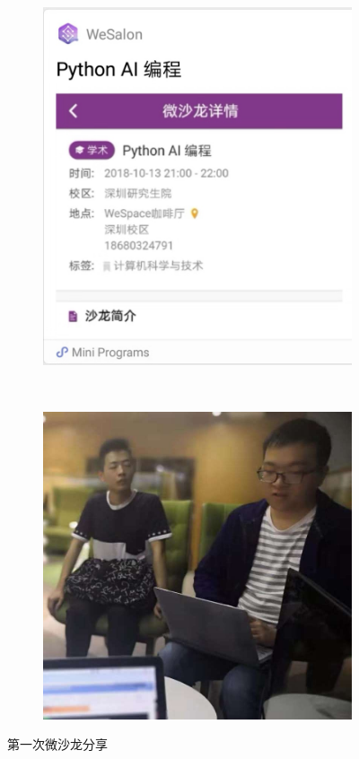 \documentclass[12pt]{ctexart}
\begin{document}
\begin{figure}[!ht]
\centering
  \begin{subfigure}[b]{0.4\textwidth}
  \includegraphics[width=\textwidth]{1/1.jpeg}  
    \end{subfigure}~
      \begin{subfigure}[b]{0.5\textwidth}
  \includegraphics[width=\textwidth]{1/wesalon.jpeg}  
    \end{subfigure}
    \caption{第一次微沙龙分享}
\end{figure}
\end{document}
